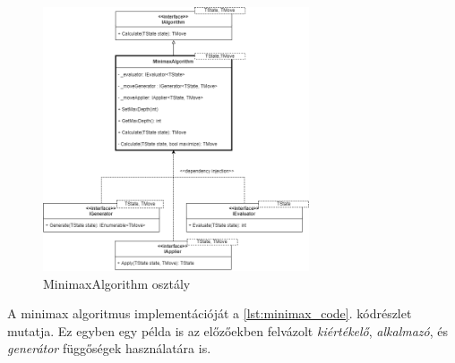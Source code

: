 \documentclass[twoside, a4paper, 12pt]{article}
\begin{document}
\begin{figure}[htbp]
	\centering
	\includegraphics[width=0.7\textwidth]{img/minimaxAbstractDiagram.png}
	\caption{MinimaxAlgorithm osztály}
	\label{fig:minimaxAbstractDiagram}
\end{figure}

A minimax algoritmus implementációját a \ref{lst:minimax_code}. kódrészlet mutatja. Ez egyben egy példa is az előzőekben felvázolt \textit{kiértékelő}, \textit{alkalmazó}, és \textit{generátor} függőségek használatára is.
\end{document}
